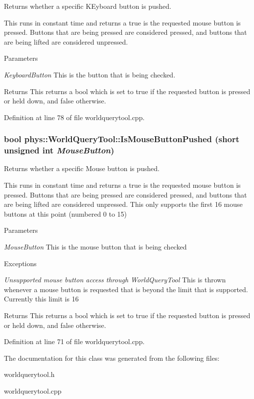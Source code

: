 Returns whether a specific KEyboard button is pushed. 

This runs in constant time and returns a true is the requested mouse button is pressed. Buttons that are being pressed are considered pressed, and buttons that are being lifted are considered unpressed. 
\begin{DoxyParams}{Parameters}
\item[{\em KeyboardButton}]This is the button that is being checked. \end{DoxyParams}
\begin{DoxyReturn}{Returns}
This returns a bool which is set to true if the requested button is pressed or held down, and false otherwise. 
\end{DoxyReturn}


Definition at line 78 of file worldquerytool.cpp.

\hypertarget{classphys_1_1WorldQueryTool_af277b578432dfaefffbc4fd9bb80ca64}{
\subsubsection[{IsMouseButtonPushed}]{\setlength{\rightskip}{0pt plus 5cm}bool phys::WorldQueryTool::IsMouseButtonPushed (short unsigned int {\em MouseButton})}}
\label{d8/d69/classphys_1_1WorldQueryTool_af277b578432dfaefffbc4fd9bb80ca64}


Returns whether a specific Mouse button is pushed. 

This runs in constant time and returns a true is the requested mouse button is pressed. Buttons that are being pressed are considered pressed, and buttons that are being lifted are considered unpressed. This only supports the first 16 mouse buttons at this point (numbered 0 to 15) 
\begin{DoxyParams}{Parameters}
\item[{\em MouseButton}]This is the mouse button that is being checked \end{DoxyParams}

\begin{DoxyExceptions}{Exceptions}
\item[{\em Unsupported mouse button access through WorldQueryTool}]This is thrown whenever a mouse button is requested that is beyond the limit that is supported. Currently this limit is 16 \end{DoxyExceptions}
\begin{DoxyReturn}{Returns}
This returns a bool which is set to true if the requested button is pressed or held down, and false otherwise. 
\end{DoxyReturn}


Definition at line 71 of file worldquerytool.cpp.



The documentation for this class was generated from the following files:\begin{DoxyCompactItemize}
\item 
worldquerytool.h\item 
worldquerytool.cpp\end{DoxyCompactItemize}
